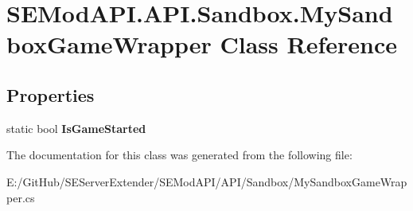 \hypertarget{class_s_e_mod_a_p_i_1_1_a_p_i_1_1_sandbox_1_1_my_sandbox_game_wrapper}{}\section{S\+E\+Mod\+A\+P\+I.\+A\+P\+I.\+Sandbox.\+My\+Sandbox\+Game\+Wrapper Class Reference}
\label{class_s_e_mod_a_p_i_1_1_a_p_i_1_1_sandbox_1_1_my_sandbox_game_wrapper}
\subsection*{Properties}
\begin{DoxyCompactItemize}
\item 
\hypertarget{class_s_e_mod_a_p_i_1_1_a_p_i_1_1_sandbox_1_1_my_sandbox_game_wrapper_ad8a2ca868de75c342aa0fb2cbecd328c}{}static bool {\bfseries Is\+Game\+Started}\label{class_s_e_mod_a_p_i_1_1_a_p_i_1_1_sandbox_1_1_my_sandbox_game_wrapper_ad8a2ca868de75c342aa0fb2cbecd328c}

\end{DoxyCompactItemize}


The documentation for this class was generated from the following file\+:\begin{DoxyCompactItemize}
\item 
E\+:/\+Git\+Hub/\+S\+E\+Server\+Extender/\+S\+E\+Mod\+A\+P\+I/\+A\+P\+I/\+Sandbox/My\+Sandbox\+Game\+Wrapper.\+cs\end{DoxyCompactItemize}
